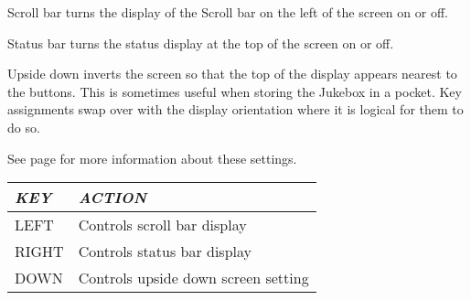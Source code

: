 {Scroll bar turns the display of the Scroll bar on the left of the screen
on or off.

Status bar turns the status display at the top of the screen on or off.

Upside down inverts the screen so that the top of the display appears
nearest to the buttons.  This is sometimes useful when storing the
Jukebox in a pocket.  Key assignments swap over with the display
orientation where it is logical for them to do so.

See page \pageref{ref:Displayoptions} for more information about these
settings.

\begin{tabular}[c]{|p{2.852cm}|p{8.387cm}|}
\hline
{\centering\bfseries\itshape
KEY
\par}
&
{\centering\bfseries\itshape
ACTION
\par}
\\\hline
{\centering
LEFT
\par}
&
Controls scroll bar display
\\\hline
{\centering
RIGHT
\par}
&
Controls status bar display
\\\hline
{\centering
DOWN
\par}
&
Controls upside down screen setting
\\\hline
\end{tabular}
}
